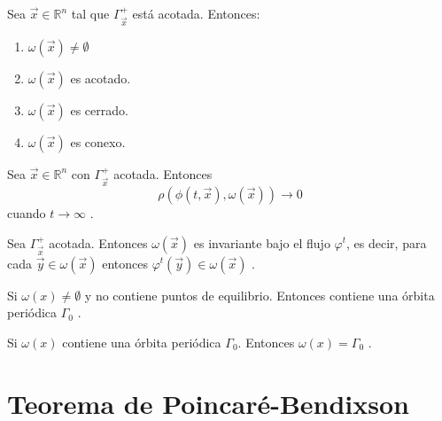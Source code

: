\begin{lemma}
	Sea $\vec{x}\in\mathbb{R}^n$ tal que $\Gamma_{\vec{x}}^+$ está acotada.
	Entonces:
	\begin{enumerate}
		\item $\omega(\vec{x})\neq\emptyset$
		\item $\omega(\vec{x})$ es acotado.
		\item $\omega(\vec{x})$ es cerrado.
		\item $\omega(\vec{x})$ es conexo.
	\end{enumerate}
\end{lemma}

\begin{lemma}
	Sea $\vec{x}\in\mathbb{R}^n$ con $\Gamma_{\vec{x}}^+$ acotada.
	Entonces
	$$\rho(\phi(t,\vec{x}),\omega(\vec{x}))\to0$$
	cuando $t \to \infty$ \cite{hirsch2012differential}.
\end{lemma}

\begin{lemma}[Invarianza]
	Sea $\Gamma_{\vec{x}}^+$ acotada. Entonces $\omega(\vec{x})$
	es invariante bajo el flujo
	$\varphi^t$, es decir, para cada $\vec{y}\in\omega(\vec{x})$ entonces
	$\varphi ^t(\vec{y})\in\omega(\vec{x})$ \cite{arnold1992ordinary}.
\end{lemma}

\begin{lemma}
	Si $\omega(x)\neq\emptyset$ y no contiene puntos de equilibrio. Entonces contiene una órbita periódica $\varGamma_0$ \cite{strogatz2018nonlinear}.
\end{lemma}

\begin{lemma}
	Si $\omega(x)$ contiene una órbita periódica $\varGamma_0$. Entonces $\omega(x)=\varGamma_0$ \cite{guckenheimer1983nonlinear}.
\end{lemma}

\section{Teorema de Poincaré-Bendixson}

